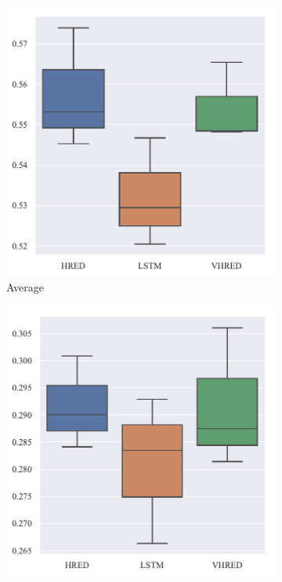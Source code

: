 \begin{figure}[H]
    \begin{subfigure}{0.25\linewidth}
        \includegraphics[width=\linewidth]{figure/boxplot/model/embedding_based_vector_average/plot.pdf}
        \centering
        \caption{Average}
    \end{subfigure}%
    \begin{subfigure}{0.25\linewidth}
        \includegraphics[width=\linewidth]{figure/boxplot/model/embedding_based_vector_extrema/plot.pdf}

\end{subfigure}
\end{figure}
